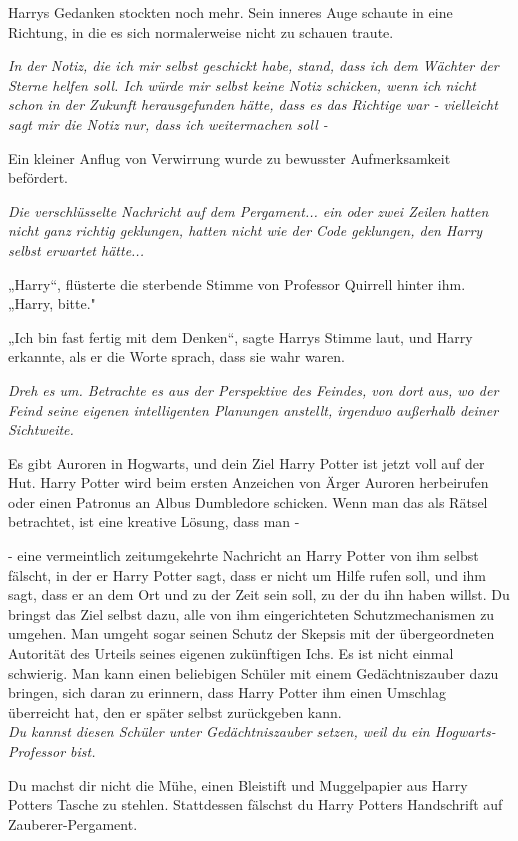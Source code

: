 {Harrys Gedanken stockten noch mehr. Sein inneres Auge schaute in eine Richtung, in die es sich normalerweise nicht zu schauen traute.

\emph{In der Notiz, die ich mir selbst geschickt habe, stand, dass ich dem Wächter der Sterne helfen soll. Ich würde mir selbst keine Notiz schicken, wenn ich nicht schon in der Zukunft herausgefunden hätte, dass es das Richtige war - vielleicht sagt mir die Notiz nur, dass ich weitermachen soll -}

Ein kleiner Anflug von Verwirrung wurde zu bewusster Aufmerksamkeit befördert.

\emph{Die verschlüsselte Nachricht auf dem Pergament... ein oder zwei Zeilen hatten nicht ganz richtig geklungen, hatten nicht wie der Code geklungen, den Harry selbst erwartet hätte...}

„Harry“, flüsterte die sterbende Stimme von Professor Quirrell hinter ihm. „Harry, bitte."

„Ich bin fast fertig mit dem Denken“, sagte Harrys Stimme laut, und Harry erkannte, als er die Worte sprach, dass sie wahr waren.

\emph{Dreh es um. Betrachte es aus der Perspektive des Feindes, von dort aus, wo der Feind seine eigenen intelligenten Planungen anstellt, irgendwo außerhalb deiner Sichtweite.}

Es gibt Auroren in Hogwarts, und dein Ziel Harry Potter ist jetzt voll auf der Hut. Harry Potter wird beim ersten Anzeichen von Ärger Auroren herbeirufen oder einen Patronus an Albus Dumbledore schicken. Wenn man das als Rätsel betrachtet, ist eine kreative Lösung, dass man -

- eine vermeintlich zeitumgekehrte Nachricht an Harry Potter von ihm selbst fälscht, in der er Harry Potter sagt, dass er nicht um Hilfe rufen soll, und ihm sagt, dass er an dem Ort und zu der Zeit sein soll, zu der du ihn haben willst. Du bringst das Ziel selbst dazu, alle von ihm eingerichteten Schutzmechanismen zu umgehen. Man umgeht sogar seinen Schutz der Skepsis mit der übergeordneten Autorität des Urteils seines eigenen zukünftigen Ichs. Es ist nicht einmal schwierig. Man kann einen beliebigen Schüler mit einem Gedächtniszauber dazu bringen, sich daran zu erinnern, dass Harry Potter ihm einen Umschlag überreicht hat, den er später selbst zurückgeben kann.\\ \emph{\hfill\break Du kannst diesen Schüler unter Gedächtniszauber setzen, weil du ein Hogwarts-Professor bist.}

Du machst dir nicht die Mühe, einen Bleistift und Muggelpapier aus Harry Potters Tasche zu stehlen. Stattdessen fälschst du Harry Potters Handschrift auf Zauberer-Pergament.

}
